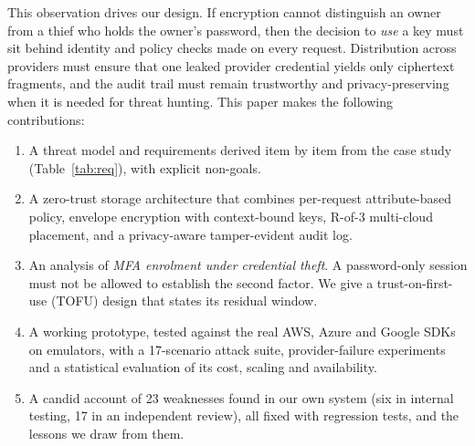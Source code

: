 \documentclass[conference]{IEEEtran}
\begin{document}
This observation drives our design. If encryption cannot distinguish an owner from a thief who holds the owner's password, then the decision to \emph{use} a key must sit behind identity and policy checks made on every request. Distribution across providers must ensure that one leaked provider credential yields only ciphertext fragments, and the audit trail must remain trustworthy and privacy-preserving when it is needed for threat hunting. This paper makes the following contributions:
\begin{enumerate}
\item A threat model and requirements derived item by item from the case study (Table~\ref{tab:req}), with explicit non-goals.
\item A zero-trust storage architecture that combines per-request attribute-based policy, envelope encryption with context-bound keys, R-of-3 multi-cloud placement, and a privacy-aware tamper-evident audit log.
\item An analysis of \emph{MFA enrolment under credential theft}. A password-only session must not be allowed to establish the second factor. We give a trust-on-first-use (TOFU) design that states its residual window.
\item A working prototype, tested against the real AWS, Azure and Google SDKs on emulators, with a 17-scenario attack suite, provider-failure experiments and a statistical evaluation of its cost, scaling and availability.
\item A candid account of 23 weaknesses found in our own system (six in internal testing, 17 in an independent review), all fixed with regression tests, and the lessons we draw from them.
\end{enumerate}
\end{document}
